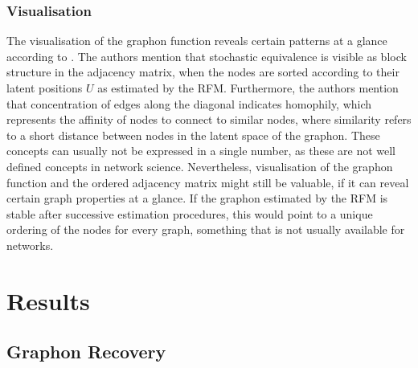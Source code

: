 \documentclass[11pt]{report} %
\begin{document}
\subsection{Visualisation}
The visualisation of the graphon function reveals certain patterns at a glance according to . The authors mention that stochastic equivalence is visible as block structure in the adjacency matrix, when the nodes are sorted according to their latent positions $U$ as estimated by the RFM. Furthermore, the authors mention that concentration of edges along the diagonal indicates homophily, which represents the affinity of nodes to connect to similar nodes, where similarity refers to a short distance between nodes in the latent space of the graphon.
These concepts can usually not be expressed in a single number, as these are not well defined concepts in network science.
Nevertheless, visualisation of the graphon function and the ordered adjacency matrix might still be valuable, if it can reveal certain graph properties at a glance.
If the graphon estimated by the RFM is stable after successive estimation procedures, this would point to a unique ordering of the nodes for every graph, something that is not usually available for networks.
\chapter{Results}
\section{Graphon Recovery}
\label{provengraphonresult}
\end{document}
